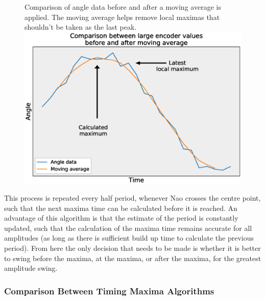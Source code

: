 \documentclass[11pt]{article}
\begin{document}
    \begin{figure}[!htb]
        \centering
        \captionbox
             {Comparison of angle data before and after a moving average is applied. The moving average helps remove local maximas that shouldn't be taken as the last peak. \label{fig:MovingAverageDiagram}}
             {\includegraphics[width=1.0\textwidth]{MovingAverageDiagram.eps}}
    \end{figure}


This process is repeated every half period, whenever Nao crosses the centre point, such that the next maxima time can be calculated before it is reached. An advantage of this algorithm is that the estimate of the period is constantly updated, such that the calculation of the maxima time remains accurate for all amplitudes (as long as there is sufficient build up time to calculate the previous period). From here the only decision that needs to be made is whether it is better to swing before the maxima, at the maxima, or after the maxima, for the greatest amplitude swing.

\subsubsection{Comparison Between Timing Maxima Algorithms}
 
\end{document}
